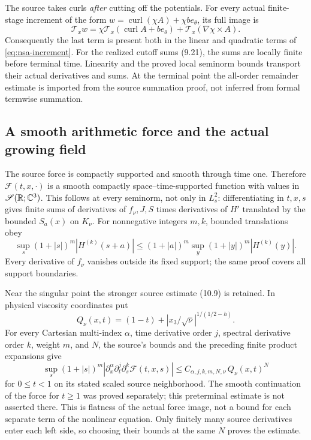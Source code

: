The source takes curls \emph{after} cutting off the potentials.
For every actual finite-stage increment of the form
\(w=\operatorname{curl}(\chi A)+\chi b e_\theta\), its full image is
\[
 \mathcal T_xw=\chi\mathcal T_x(\operatorname{curl}A+b e_\theta)
                    +\mathcal T_x(\nabla\chi\times A).
\]
Consequently the last term is present both in the linear and
quadratic terms of \eqref{eq:nsa-increment}. For the realized
cutoff sums (9.21), the sums are locally finite before terminal
time. Linearity and the proved local seminorm bounds transport
their actual derivatives and sums. At the terminal point the
all-order remainder estimate is imported from the source
summation proof, not inferred from formal termwise summation.

\subsection{A smooth arithmetic force and the actual growing field}

The source force is compactly supported and smooth through time one.
Therefore \(\mathcal F(t,x,\cdot)\) is a smooth compactly
space--time-supported function with values in
\(\mathscr S(\mathbb R;\mathbb C^3)\). This follows at every seminorm, not only
in \(L^2_s\): differentiating in \(t,x,s\) gives finite sums of
derivatives of \(f_\nu,J,S\) times derivatives of \(H'\) translated
by the bounded \(S_a(x)\) on \(K_\nu\). For nonnegative integers
\(m,k\), bounded translations obey
\[
 \sup_s(1+|s|)^m|H^{(k)}(s+a)|
 \leq (1+|a|)^m
           \sup_y(1+|y|)^m|H^{(k)}(y)|.
\]
Every derivative of \(f_\nu\) vanishes outside its fixed support;
the same proof covers all support boundaries.

Near the singular point the stronger source estimate (10.9) is
retained. In physical viscosity coordinates put
\[
 Q_\nu(x,t)=(1-t)+|x_3/\sqrt\nu|^{1/(1/2-h)} .
\]
For every Cartesian multi-index \(\alpha\), time derivative order
\(j\), spectral derivative order \(k\), weight \(m\), and \(N\),
the source's bounds and the preceding finite product expansions give
\begin{equation}\label{eq:nsa-flatforce}
 \sup_s(1+|s|)^m
 |\partial_x^\alpha\partial_t^j\partial_s^k
            \mathcal F(t,x,s)|
 \leq C_{\alpha,j,k,m,N,\nu}\,Q_\nu(x,t)^N
\end{equation}
for \(0\leq t<1\) on its stated scaled source neighborhood.
The smooth continuation of the force for \(t\geq1\) was proved
separately; this preterminal estimate is not asserted there.
This is flatness of the actual force
image, not a bound for each separate term of the nonlinear equation.
Only finitely many source derivatives enter each left side, so choosing
their bounds at the same \(N\) proves the estimate.

